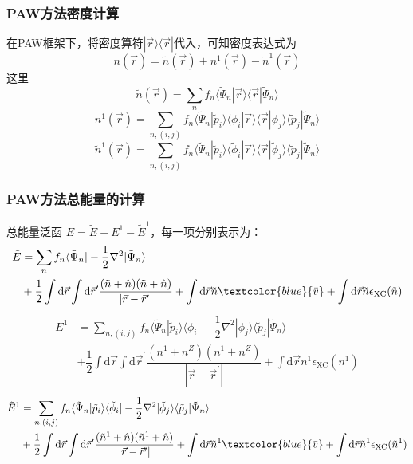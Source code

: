 \frame
{
\frametitle{\textrm{PAW}方法密度计算}
在\textrm{PAW}框架下，将密度算符$|\vec r\rangle\langle\vec r|$代入，可知密度表达式为
$$n(\vec r)=\tilde n(\vec r)+n^1(\vec r)-\tilde n^1(\vec r)$$
这里
$$\tilde n(\vec r)=\sum_nf_n\langle\tilde\Psi_n|\vec r\rangle\langle\vec r|\tilde\Psi_n\rangle$$ 
$$n^1(\vec r)=\sum_{n,(i,j)}f_n\langle\tilde\Psi_n|\tilde p_i\rangle\langle\phi_i|\vec r\rangle\langle\vec r|\phi_j\rangle\langle\tilde p_j|\tilde\Psi_n\rangle$$
$$\tilde n^1(\vec r)=\sum_{n,(i,j)}f_n\langle\tilde\Psi_n|\tilde p_i\rangle\langle\tilde\phi_i|\vec r\rangle\langle\vec r|\tilde\phi_j\rangle\langle\tilde p_j|\tilde\Psi_n\rangle$$
}

\frame
{
\frametitle{\textrm{PAW}方法总能量的计算}
总能量泛函
$E=\tilde E+E^1-\tilde E^1$，每一项分别表示为：
\begin{displaymath}
	\begin{aligned}
		\tilde E&=\sum_nf_n\langle\tilde\Psi_n|-\dfrac12\nabla^2|\tilde\Psi_n\rangle\\
		&+\dfrac12\int\mathrm{d}\vec r\int\mathrm{d}\vec r^{\prime}\dfrac{(\tilde n+\hat n)(\tilde n+\hat n)}{|\vec r-\vec r^{\prime}|}+\int\mathrm{d}\vec r \tilde n\textcolor{blue}{\bar v}+\int\mathrm{d}\vec r \tilde n\epsilon_{\mathrm{XC}}(\tilde n)
 	\end{aligned}
\end{displaymath}
\begin{displaymath}
	\begin{aligned}
		E^1&=\sum_{n,(i,j)}f_n\langle\tilde\Psi_n|\tilde p_i\rangle\langle\phi_i|-\dfrac12\nabla^2|\phi_j\rangle\langle\tilde p_j|\tilde\Psi_n\rangle\\
		 &+\dfrac12\int\mathrm{d}\vec r\int\mathrm{d}\vec r^{\prime}\dfrac{(n^1+n^Z)(n^1+n^Z)}{|\vec r-\vec r^{\prime}|}+\int\mathrm{d}\vec r n^1\epsilon_{\mathrm{XC}}(n^1)
 	\end{aligned}
\end{displaymath}
\begin{displaymath}
	\begin{aligned}
		\tilde E^1&=\sum_{n,(i,j)}f_n\langle\tilde\Psi_n|\tilde p_i\rangle\langle\tilde\phi_i|-\dfrac12\nabla^2|\tilde\phi_j\rangle\langle\tilde p_j|\tilde\Psi_n\rangle\\
		&+\dfrac12\int\mathrm{d}\vec r\int\mathrm{d}\vec r^{\prime}\dfrac{(\tilde n^1+\hat n)(\tilde n^1+\hat n)}{|\vec r-\vec r^{\prime}|}+\int\mathrm{d}\vec r \tilde n^1\textcolor{blue}{\bar v}+\int\mathrm{d}\vec r \tilde n^1\epsilon_{\mathrm{XC}}(\tilde n^1)
 	\end{aligned}
\end{displaymath}
}

